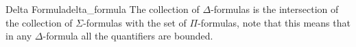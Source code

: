 \begin{definition}{Delta Formula}{delta_formula}
The collection of \( \Delta  \)-formulas is the intersection of the collection
of \( \Sigma  \)-formulas with the set of \( \Pi  \)-formulas, note that this
means that in any \( \Delta  \)-formula all the quantifiers are bounded.
\end{definition}
